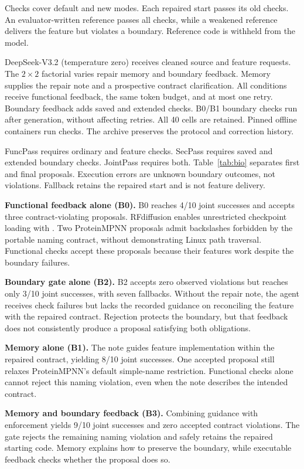 Checks cover default and new modes. Each repaired start passes its old checks. An evaluator-written reference passes all checks, while a weakened reference delivers the feature but violates a boundary. Reference code is withheld from the model.

DeepSeek-V3.2 (temperature zero) receives cleaned source and feature requests. The $2\times2$ factorial varies repair memory and boundary feedback. Memory supplies the repair note and a prospective contract clarification. All conditions receive functional feedback, the same token budget, and at most one retry. Boundary feedback adds saved and extended checks. B0/B1 boundary checks run after generation, without affecting retries. All 40 cells are retained. Pinned offline containers run checks. The archive preserves the protocol and correction history.

FuncPass requires ordinary and feature checks. SecPass requires saved and extended boundary checks. JointPass requires both. Table~\ref{tab:bio} separates first and final proposals. Execution errors are unknown boundary outcomes, not violations. Fallback retains the repaired start and is not feature delivery.

\noindent\textbf{Functional feedback alone (B0).} B0 reaches 4/10 joint successes and accepts three contract-violating proposals. RFdiffusion enables unrestricted checkpoint loading with . Two ProteinMPNN proposals admit backslashes forbidden by the portable naming contract, without demonstrating Linux path traversal. Functional checks accept these proposals because their features work despite the boundary failures.

\noindent\textbf{Boundary gate alone (B2).} B2 accepts zero observed violations but reaches only 3/10 joint successes, with seven fallbacks. Without the repair note, the agent receives check failures but lacks the recorded guidance on reconciling the feature with the repaired contract. Rejection protects the boundary, but that feedback does not consistently produce a proposal satisfying both obligations.

\noindent\textbf{Memory alone (B1).} The note guides feature implementation within the repaired contract, yielding 8/10 joint successes. One accepted proposal still relaxes ProteinMPNN's default simple-name restriction. Functional checks alone cannot reject this naming violation, even when the note describes the intended contract.

\noindent\textbf{Memory and boundary feedback (B3).} Combining guidance with enforcement yields 9/10 joint successes and zero accepted contract violations. The gate rejects the remaining naming violation and safely retains the repaired starting code. Memory explains how to preserve the boundary, while executable feedback checks whether the proposal does so.

